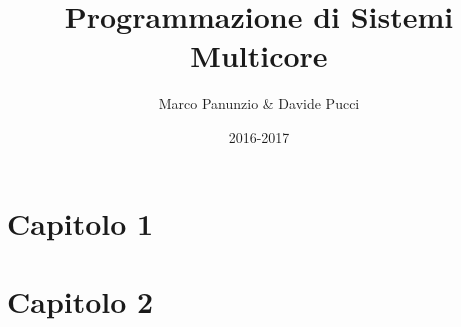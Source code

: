 

\title{Programmazione di Sistemi Multicore}
\author{Marco Panunzio \& Davide Pucci}
\date{2016-2017}


	
\maketitle
	
\tableofcontents

\chapter{Capitolo 1}


\chapter{Capitolo 2}


